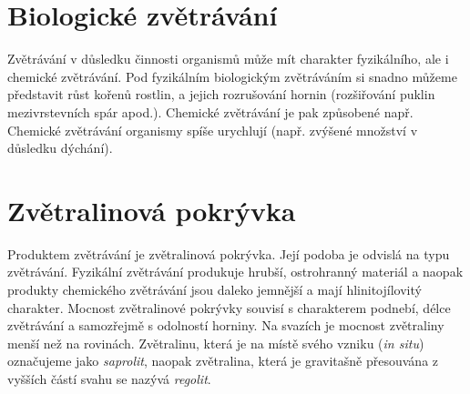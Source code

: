 \section{Biologické zvětrávání}
Zvětrávání v důsledku činnosti organismů může mít charakter fyzikálního, ale i chemické zvětrávání. Pod fyzikálním biologickým zvětráváním si snadno můžeme představit růst kořenů rostlin, a jejich rozrušování hornin (rozšiřování puklin mezivrstevních spár apod.). Chemické zvětrávání je pak způsobené např.  Chemické zvětrávání organismy spíše urychlují (např. zvýšené množství  v důsledku dýchání). 

\section{Zvětralinová pokrývka}
Produktem zvětrávání je zvětralinová pokrývka. Její podoba je odvislá na typu zvětrávání. Fyzikální zvětrávání produkuje hrubší, ostrohranný materiál a naopak produkty chemického zvětrávání jsou daleko jemnější a mají hlinitojílovitý charakter. Mocnost zvětralinové pokrývky souvisí s charakterem podnebí, délce zvětrávání a samozřejmě s odolností horniny. Na svazích je mocnost zvětraliny menší než na rovinách. Zvětralinu, která je na místě svého vzniku (\textit{in situ}) označujeme jako \emph{saprolit}, naopak zvětralina, která je gravitašně přesouvána z vyšších částí svahu se nazývá \emph{regolit}.

%
%
%
%

